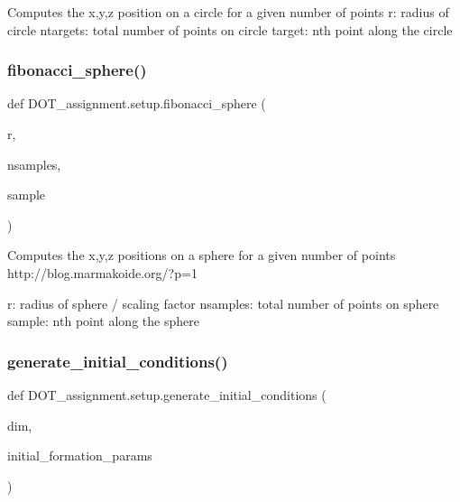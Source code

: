 \begin{DoxyVerb}Computes the x,y,z position on a circle for a given number of points
r: radius of circle
ntargets: total number of points on circle
target: nth point along the circle
\end{DoxyVerb}
 \mbox{\label{namespace_d_o_t__assignment_1_1setup_a7e2f8ba24cedf939649b3cd695c303f4}} 
\subsubsection{\texorpdfstring{fibonacci\_sphere()}{fibonacci\_sphere()}}
{\footnotesize\ttfamily def D\+O\+T\+\_\+assignment.\+setup.\+fibonacci\+\_\+sphere (\begin{DoxyParamCaption}\item[{}]{r,  }\item[{}]{nsamples,  }\item[{}]{sample }\end{DoxyParamCaption})}

\begin{DoxyVerb}Computes the x,y,z positions on a sphere for a given number of points
http://blog.marmakoide.org/?p=1

r: radius of sphere / scaling factor
nsamples: total number of points on sphere
sample: nth point along the sphere
\end{DoxyVerb}
 \mbox{\label{namespace_d_o_t__assignment_1_1setup_a8beda6cfa86fe6bed2f106b9a340637b}} 
\subsubsection{\texorpdfstring{generate\_initial\_conditions()}{generate\_initial\_conditions()}}
{\footnotesize\ttfamily def D\+O\+T\+\_\+assignment.\+setup.\+generate\+\_\+initial\+\_\+conditions (\begin{DoxyParamCaption}\item[{}]{dim,  }\item[{}]{initial\+\_\+formation\+\_\+params }\end{DoxyParamCaption})}

